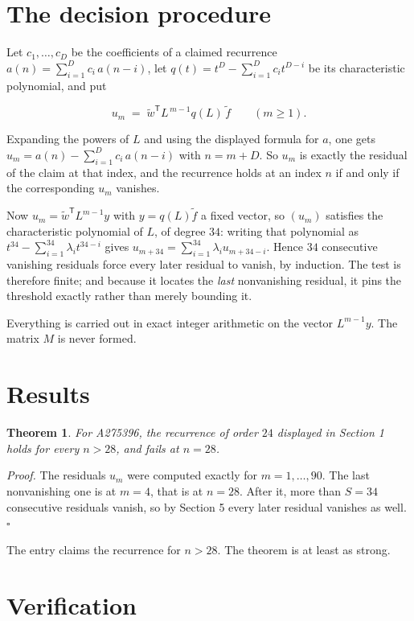 \documentclass[11pt]{article}
\newtheorem{theorem}{Theorem}
\theoremstyle{definition}
\begin{document}
\section{The decision procedure}

Let $c_1,\dots,c_D$ be the coefficients of a claimed recurrence $a(n) = \sum_{i=1}^{D} c_i\,a(n-i)$, let $q(t) = t^{D} - \sum_{i=1}^{D} c_i t^{D-i}$ be its characteristic polynomial, and put

\[u_m \;=\; \tilde w^{\mathsf T} L^{\,m-1} q(L)\,\tilde f \qquad (m \ge 1).\]

Expanding the powers of $L$ and using the displayed formula for $a$, one gets $u_m = a(n) - \sum_{i=1}^{D} c_i\,a(n-i)$ with $n = m + D$. So $u_m$ is exactly the residual of the claim at that index, and the recurrence holds at an index $n$ if and only if the corresponding $u_m$ vanishes.

Now $u_m = \tilde w^{\mathsf T} L^{m-1} y$ with $y = q(L)\tilde f$ a fixed vector, so $(u_m)$ satisfies the characteristic polynomial of $L$, of degree $34$: writing that polynomial as $t^{34} - \sum_{i=1}^{34} \lambda_i t^{34-i}$ gives $u_{m+34} = \sum_{i=1}^{34} \lambda_i u_{m+34-i}$. Hence $34$ consecutive vanishing residuals force every later residual to vanish, by induction. The test is therefore finite; and because it locates the {\itshape last} nonvanishing residual, it pins the threshold exactly rather than merely bounding it.

Everything is carried out in exact integer arithmetic on the vector $L^{m-1}y$. The matrix $M$ is never formed.

\section{Results}

\begin{theorem} For A275396, the recurrence of order $24$ displayed in Section 1 holds for every $n > 28$, and fails at $n = 28$.\end{theorem}

{\itshape Proof.} The residuals $u_m$ were computed exactly for $m = 1,\dots,90$. The last nonvanishing one is at $m = 4$, that is at $n = 28$. After it, more than $S = 34$ consecutive residuals vanish, so by Section 5 every later residual vanishes as well. $\square$

The entry claims the recurrence for $n > 28$. The theorem is at least as strong.

\section{Verification}
\end{document}

